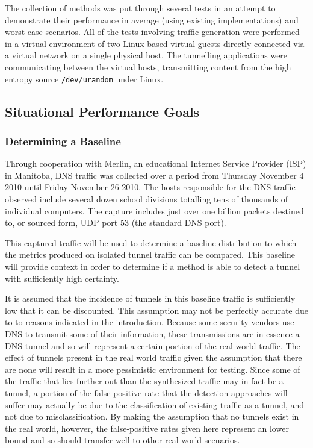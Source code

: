 \documentclass{llncs}
\begin{document}
The collection of methods was put through several tests in an attempt to
demonstrate their performance in average (using existing implementations) and
worst case scenarios. All of the tests involving traffic generation were
performed in a virtual environment of two Linux-based virtual guests directly
connected via a virtual network on a single physical host. The tunnelling
applications were communicating between the virtual hosts, transmitting content
from the high entropy source \texttt{/dev/urandom} under Linux.

\subsection{Situational Performance Goals}
\subsubsection{Determining a Baseline}
\label{baseline}
Through cooperation with Merlin, an educational Internet Service Provider (ISP)
in Manitoba, DNS traffic was collected over a period from Thursday November 4
2010 until Friday November 26 2010. The hosts responsible for the DNS traffic
observed include several dozen school divisions totalling tens of thousands of
individual computers. The capture includes just over one billion packets
destined to, or sourced form, UDP port 53 (the standard DNS port).

This captured traffic will be used to determine a baseline distribution to which
the metrics produced on isolated tunnel traffic can be compared. This baseline
will provide context in order to determine if a method is able to detect a
tunnel with sufficiently high certainty.

It is assumed that the incidence of tunnels in this baseline traffic is
sufficiently low that it can be discounted. This assumption may not be perfectly
accurate due to to reasons indicated in the introduction. Because some security
vendors use DNS to transmit some of their information, these transmissions are
in essence a DNS tunnel and so will represent a certain portion of the real
world traffic. The effect of tunnels present in the real world traffic given the
assumption that there are none will result in a more pessimistic environment for
testing. Since some of the traffic that lies further out than the synthesized
traffic may in fact be a tunnel, a portion of the false positive rate that the
detection approaches will suffer may actually be due to the classification of
existing traffic as a tunnel, and not due to misclassification. By making the
assumption that no tunnels exist in the real world, however, the false-positive
rates given here represent an lower bound and so should transfer well to other
real-world scenarios.
\end{document}
